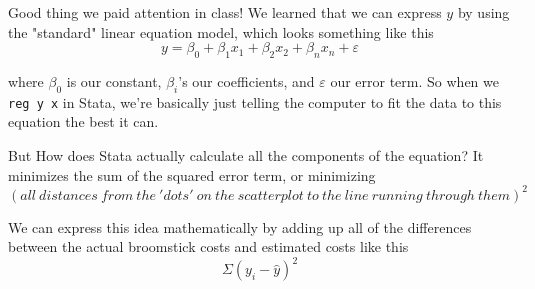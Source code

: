 \documentclass{article}                 %
\begin{document}
	Good thing we paid attention in class! We learned that we can express $y$ by using the "standard" linear equation model, which looks something like this $$y = \beta_0 + \beta_{1}x_1 + \beta_{2}x_2 + \beta_{n}x_n + \varepsilon$$

	where $\beta_0$ is our constant, $\beta_i$'s our coefficients, and $\varepsilon$ our error term. So when we \texttt{reg y x} in Stata, we're basically just telling the computer to fit the data to this equation the best it can.

	But How does Stata actually calculate all the components of the equation? It minimizes the sum of the squared error term, or minimizing $$(all\:distances \:from \:the \:'dots' \:on \:the \:scatterplot \:to \:the \:line \:running \:through \:them)^2$$


	We can express this idea mathematically by adding up all of the differences between the actual broomstick costs and estimated costs like this $$\Sigma(y_i - \hat{y})^2  $$
\end{document}
